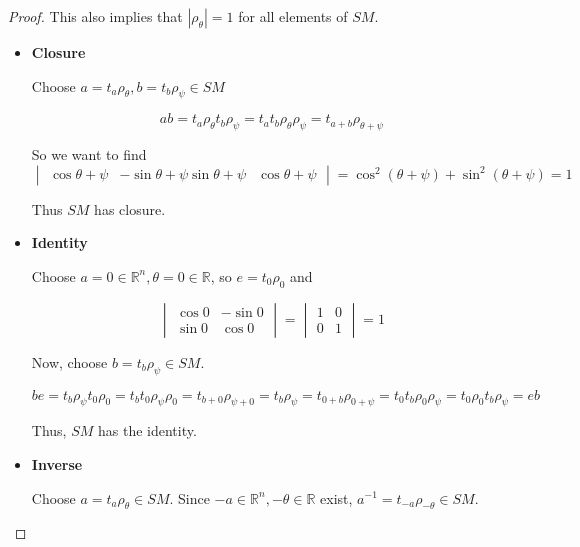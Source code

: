 \documentclass[12pt,letterpaper]{article}
\begin{document}
\begin{enumerate}
\begin{proof}
        This also implies that $|\rho_\theta| = 1$ for all elements of $SM$.
        \begin{itemize}
          \item \textbf{Closure}

            Choose $a = t_a \rho_\theta, b = t_b \rho_\psi \in SM$

            \[
              ab = t_a \rho_\theta t_b \rho_\psi = t_a t_b \rho_\theta \rho_\psi = t_{a + b} \rho_{\theta + \psi}
            \]

            So we want to find
            \[
              \begin{vmatrix}
                \cos{\theta + \psi} & -\sin{\theta + \psi}
                \sin{\theta + \psi} & \cos{\theta + \psi}
              \end{vmatrix}
              = \cos^2(\theta + \psi) + \sin^2(\theta + \psi)
              = 1
            \]

            Thus $SM$ has closure.

          \item \textbf{Identity}

            Choose $a = 0 \in \mathbb{R}^n, \theta = 0 \in \mathbb{R}$,
            so $e = t_0 \rho_0$ and

            \[
              \begin{vmatrix}
                \cos{0} & -\sin{0} \\
                \sin{0} & \cos{0}
              \end{vmatrix}
              =
              \begin{vmatrix}
                1 & 0 \\
                0 & 1
              \end{vmatrix}
              = 1
            \]

            Now, choose $b = t_b \rho_\psi \in SM$.

            \[
              be = t_b \rho_\psi t_0 \rho_0 = t_b t_0 \rho_\psi \rho_0 = t_{b + 0} \rho_{\psi + 0} = t_b \rho_\psi = t_{0 + b} \rho_{0 + \psi} = t_0 t_b \rho_0 \rho_\psi = t_0 \rho_0 t_b \rho_\psi = eb
            \]

            Thus, $SM$ has the identity.

          \item \textbf{Inverse}

            Choose $a = t_a \rho_\theta \in SM$.
            Since $-a \in \mathbb{R}^n, -\theta \in \mathbb{R}$ exist,
            $a^{-1} = t_{-a} \rho_{-\theta} \in SM$.


\end{itemize}
\end{proof}
\end{enumerate}
\end{document}
